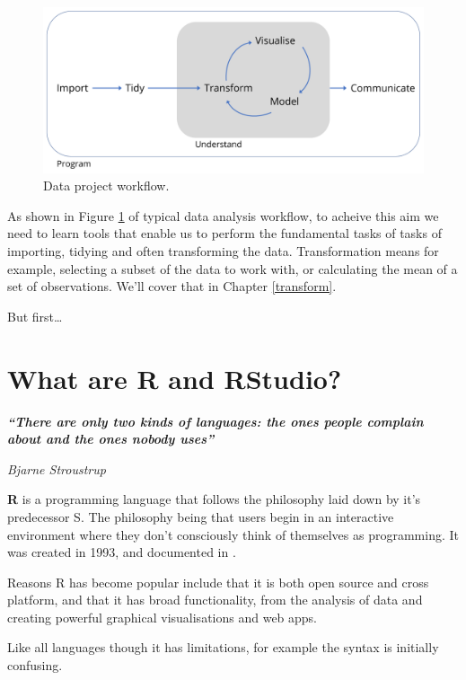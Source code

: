 \documentclass[12pt,]{book}
\begin{document}
\begin{figure}

{\centering \includegraphics[width=0.8\linewidth]{img/data_project_pipeline} 

}

\caption{Data project workflow.}\label{fig:pipeline}
\end{figure}

As shown in Figure \ref{fig:pipeline} of typical data analysis workflow,
to acheive this aim we need to learn tools that enable us to perform the
fundamental tasks of tasks of importing, tidying and
often transforming the data. Transformation means for example, selecting a
subset of the data to work with, or calculating the mean of a set of observations.
We'll cover that in Chapter \ref{transform}.

But first\ldots{}

\hypertarget{r-rstudio}{%
\section{What are R and RStudio?}\label{r-rstudio}}

\textbf{\emph{``There are only two kinds of languages: the ones people complain about and the ones nobody uses''}}

\emph{Bjarne Stroustrup}

\textbf{R} is a programming language that follows the philosophy laid down by it's
predecessor S. The philosophy being that users begin in an interactive
environment where they don't consciously think of themselves as programming.
It was created in 1993, and documented in \citep{ihaka1996}.

Reasons R has become popular include that it is both open source and cross platform,
and that it has broad functionality, from the analysis of data and creating
powerful graphical visualisations and web apps.

Like all languages though it has limitations, for example the syntax is initially
confusing.
\end{document}
